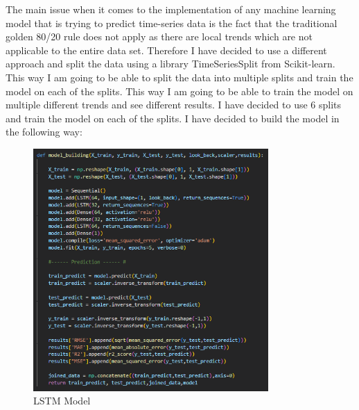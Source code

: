 \documentclass{imc-inf}
\begin{document}
	The main issue when it comes to the implementation of any machine learning model that is trying to predict time-series data is the fact that the traditional golden 80/20 rule does not apply as
	there are local trends which are not applicable to the entire data set. Therefore I have decided to use a different approach and split the data using a library TimeSeriesSplit from Scikit-learn.
	This way I am going to be able to split the data into multiple splits and train the model on each of the splits. This way I am going to be able to train the model on multiple different trends and
	see different results.
	I have decided to use 6 splits and train the model on each of the splits.
	I have decided to build the model in the following way:
	\begin{figure}
		\centering
		\includegraphics[width=0.8\textwidth]{lstm_code.png}
		\caption{LSTM Model}
		\label{fig:lstm_model}
	\end{figure}
	
\end{document}
